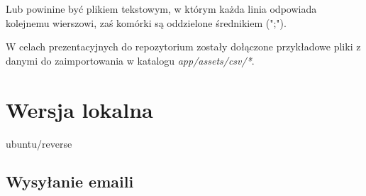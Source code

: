 Lub powinine być plikiem tekstowym, w którym każda linia odpowiada kolejnemu wierszowi, zaś komórki są oddzielone średnikiem (";").

W celach prezentacyjnych do repozytorium zostały dołączone przykładowe pliki z danymi do zaimportowania w katalogu \textit{app/assets/csv/*}.
	
\section{Wersja lokalna}

ubuntu/reverse

\subsection{Wysyłanie emaili}
\label{dev_mailer}